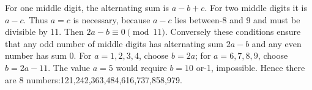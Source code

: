 For one middle digit, the alternating sum is $a-b+c$. For two middle digits it is $a-c$. Thus $a=c$ is necessary, because $a-c$ lies between-8 and 9 and must be divisible by 11. Then $2a-b\equiv0\pmod{11}$. Conversely these conditions ensure that any odd number of middle digits has alternating sum $2a-b$ and any even number has sum 0. For $a=1,2,3,4$, choose $b=2a$; for $a=6,7,8,9$, choose $b=2a-11$. The value $a=5$ would require $b=10$ or-1, impossible. Hence there are $\boxed8$ numbers:121,242,363,484,616,737,858,979.
